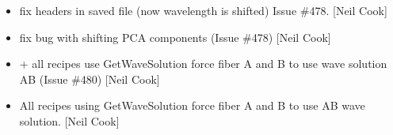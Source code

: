 \documentclass[a4paper,10pt,english]{report}
\begin{document}
\begin{itemize}
\item {} 
 \sphinxhyphen{} fix headers in saved file (now wavelength is
shifted) \sphinxhyphen{} Issue \#478. {[}Neil Cook{]}

\item {} 
 \sphinxhyphen{} fix bug with shifting PCA components (Issue \#478)
{[}Neil Cook{]}

\item {} 
 + all recipes use GetWaveSolution \sphinxhyphen{} force fiber A and B
to use wave solution AB (Issue \#480) {[}Neil Cook{]}

\item {} 
All recipes using GetWaveSolution \sphinxhyphen{} force fiber A and B to use AB wave
solution. {[}Neil Cook{]}

\end{itemize}
\end{document}
